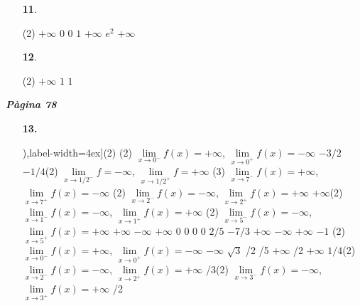 \documentclass[a4paper, pdf, twoside]{book}
\begin{document}
\begin{multicols}{2}
\begin{enumerate}

 \item[\fontfamily{phv}\selectfont\color{blue}\textbf{11}. ] 
 \begin{tasks}[column-sep=1em, item-indent=1.3333em](2)
	 \task $+\infty $
	 \task $0$
	 \task $0$
	 \task $1$
	 \task $+\infty $
	 \task $e^2$
	 \task $+\infty $
\end{tasks}
 \end{enumerate}
\begin{enumerate}
\vspace{0.25cm}



 \item[\fontfamily{phv}\selectfont\color{blue}\textbf{12}. ] 
 \begin{tasks}[column-sep=1em, item-indent=1.3333em](2)
	 \task $+\infty $
	 \task $1$
	 \task $1$
\end{tasks}
 \end{enumerate}
\vspace{0.3cm}


{\textbf{\em Pàgina 78}} \hrulefill
\begin{enumerate}
\vspace{0.25cm}
\item[\fontfamily{phv}\selectfont\color{blue}\textbf{13. }]  \scalebox{0.6}{\simbolclau } 
\begin{tasks}[counter-format=(tsk[1]),label-width=4ex](2) \task *(2) $\mathop {lim}\limits _{x\to 0^- } f(x)=+\infty $, $\mathop {lim}\limits _{x\to 0^+ } f(x)=-\infty $ \task $-3/2$ \task $-1/4$\startnewitemline \task *(2) $\mathop {lim}\limits _{x\to 1/2^- } f=-\infty $, $\mathop {lim}\limits _{x\to 1/2^+ } f=+\infty $ \startnewitemline \task *(3) $\mathop {lim}\limits _{x\to 7^- } f(x)=+\infty $, $\mathop {lim}\limits _{x\to 7^+ } f(x)=-\infty $ \task *(2) $\mathop {lim}\limits _{x\to 2^- } f(x)=-\infty $, $\mathop {lim}\limits _{x\to 2^+ } f(x)=+\infty $ \task $+\infty $\startnewitemline \task *(2) $\mathop {lim}\limits _{x\to 1^- } f(x)=-\infty $, $\mathop {lim}\limits _{x\to 1^+ } f(x)=+\infty $ \startnewitemline \task *(2) $\mathop {lim}\limits _{x\to 5^- } f(x)=-\infty $, $\mathop {lim}\limits _{x\to 5^+ } f(x)=+\infty $  \task $+\infty $ \task $-\infty $ \task $+\infty $ \task $0$ \task $0$ \task $0$ \task $0$ \task $2/5$ \task $-7/3$ \task $+\infty $ \task $-\infty $ \task $+\infty $ \task $-1$ \task *(2) $\mathop {lim}\limits _{x\to 0^- } f(x)=+\infty $, $\mathop {lim}\limits _{x\to 0^+ } f(x)=-\infty $ \task $-\infty $ \task $\sqrt {3}$ /2  /5 \task $+\infty $ /2   \task $+\infty $ \task $1/4$\startnewitemline \task *(2) $\mathop {lim}\limits _{x\to 2^- } f(x)=-\infty $, $\mathop {lim}\limits _{x\to 2^+ } f(x)=+\infty $  /3\startnewitemline \task *(2) $\mathop {lim}\limits _{x\to 3^- } f(x)=-\infty $, $\mathop {lim}\limits _{x\to 3^+ } f(x)=+\infty $ /2 \end{tasks}
 \end{enumerate}
\vspace{0.3cm}


\end{multicols}
\end{document}
